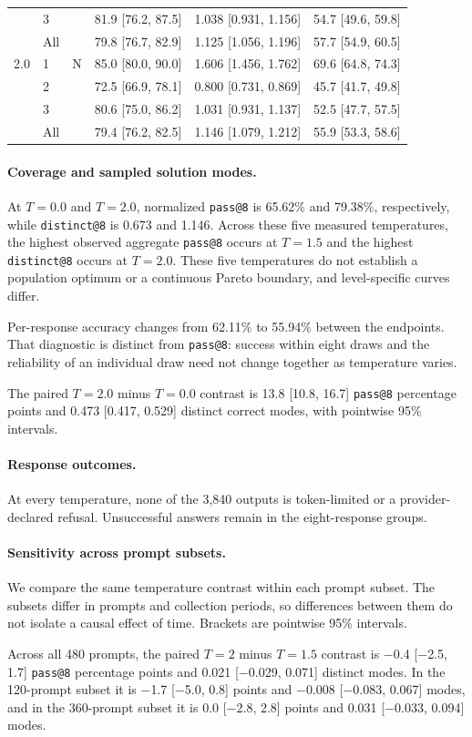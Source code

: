 \begin{table}[!htbp]
\begin{tabular}{@{}lllrrr@{}}
 & 3 &  & 81.9 [76.2, 87.5] & 1.038 [0.931, 1.156] & 54.7 [49.6, 59.8] \\
 & All &  & 79.8 [76.7, 82.9] & 1.125 [1.056, 1.196] & 57.7 [54.9, 60.5] \\
2.0 & 1 & N & 85.0 [80.0, 90.0] & 1.606 [1.456, 1.762] & 69.6 [64.8, 74.3] \\
 & 2 &  & 72.5 [66.9, 78.1] & 0.800 [0.731, 0.869] & 45.7 [41.7, 49.8] \\
 & 3 &  & 80.6 [75.0, 86.2] & 1.031 [0.931, 1.137] & 52.5 [47.7, 57.5] \\
 & All &  & 79.4 [76.2, 82.5] & 1.146 [1.079, 1.212] & 55.9 [53.3, 58.6] \\
\bottomrule
\end{tabular}
\end{table}

\paragraph{Coverage and sampled solution modes.}
At $T=0.0$ and $T=2.0$, normalized \texttt{pass@8} is 65.62\% and 79.38\%, respectively,
while \texttt{distinct@8} is 0.673 and 1.146.
Across these five measured temperatures, the highest observed aggregate
\texttt{pass@8} occurs at $T=1.5$ and the highest \texttt{distinct@8}
occurs at $T=2.0$. These five temperatures do not establish
a population optimum or a continuous Pareto boundary, and level-specific curves differ.

Per-response accuracy changes from 62.11\% to 55.94\% between the endpoints.
That diagnostic is distinct from \texttt{pass@8}: success within eight
draws and the reliability of an individual draw need not change together as temperature varies.

The paired $T=2.0$ minus $T=0.0$ contrast is 13.8 [10.8, 16.7] \texttt{pass@8} percentage points and 0.473 [0.417, 0.529] distinct correct modes, with pointwise 95\% intervals.

\paragraph{Response outcomes.}
At every temperature, none of the 3,840 outputs is token-limited or a provider-declared refusal.
Unsuccessful answers remain in the eight-response groups.

\paragraph{Sensitivity across prompt subsets.}
We compare the same temperature contrast within each prompt subset.
The subsets differ in prompts and collection periods, so differences
between them do not isolate a causal effect of time. Brackets are
pointwise 95\% intervals.

Across all 480 prompts, the paired $T=2$ minus $T=1.5$ contrast is $-$0.4 [$-$2.5, 1.7] \texttt{pass@8} percentage points and 0.021 [$-$0.029, 0.071] distinct modes.
In the 120-prompt subset it is $-$1.7 [$-$5.0, 0.8] points and $-$0.008 [$-$0.083, 0.067] modes, and in the 360-prompt subset it is 0.0 [$-$2.8, 2.8] points and 0.031 [$-$0.033, 0.094] modes.
